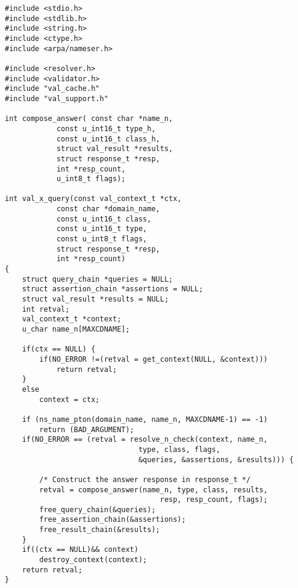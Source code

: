 \begin{verbatim}
#include <stdio.h>
#include <stdlib.h>
#include <string.h>
#include <ctype.h>
#include <arpa/nameser.h>
                                                                                                                             
#include <resolver.h>
#include <validator.h>
#include "val_cache.h"
#include "val_support.h"

int compose_answer( const char *name_n,
            const u_int16_t type_h,
            const u_int16_t class_h,
            struct val_result *results,
            struct response_t *resp,
            int *resp_count,
            u_int8_t flags);

int val_x_query(const val_context_t *ctx,
            const char *domain_name,
            const u_int16_t class,
            const u_int16_t type,
            const u_int8_t flags,
            struct response_t *resp,
            int *resp_count)
{
    struct query_chain *queries = NULL;
    struct assertion_chain *assertions = NULL;
    struct val_result *results = NULL;
    int retval;
    val_context_t *context;
    u_char name_n[MAXCDNAME];
                                                                                                                             
    if(ctx == NULL) {
        if(NO_ERROR !=(retval = get_context(NULL, &context)))
            return retval;
    }
    else
        context = ctx;
                                                                                                                             
    if (ns_name_pton(domain_name, name_n, MAXCDNAME-1) == -1)
        return (BAD_ARGUMENT);
    if(NO_ERROR == (retval = resolve_n_check(context, name_n, 
                               type, class, flags,
                               &queries, &assertions, &results))) {

        /* Construct the answer response in response_t */
        retval = compose_answer(name_n, type, class, results, 
                                    resp, resp_count, flags);
        free_query_chain(&queries);
        free_assertion_chain(&assertions);
        free_result_chain(&results);
    }
    if((ctx == NULL)&& context)
        destroy_context(context);
    return retval;
}
\end{verbatim}
